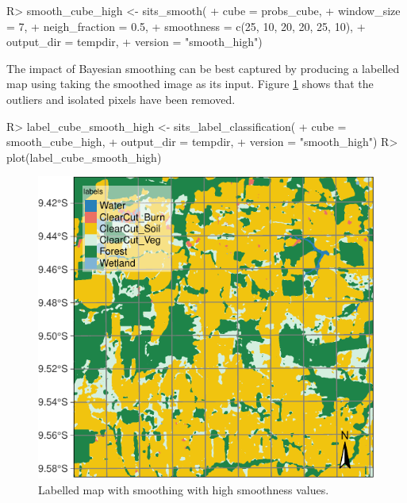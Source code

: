 \documentclass[
  shortnames]{jss}
\begin{document}
\begin{CodeChunk}
\begin{CodeInput}
R> smooth_cube_high <- sits_smooth(
+     cube = probs_cube,
+     window_size = 7,
+     neigh_fraction = 0.5,
+     smoothness = c(25, 10, 20, 20, 25, 10),
+     output_dir = tempdir,
+     version = "smooth_high")
\end{CodeInput}
\end{CodeChunk}

The impact of Bayesian smoothing can be best captured by producing a labelled map using  taking the smoothed image as its input. Figure \ref{fig:smth1} shows that the outliers and isolated pixels have been removed.

\begin{CodeChunk}
\begin{CodeInput}
R> label_cube_smooth_high <- sits_label_classification(
+     cube = smooth_cube_high,
+     output_dir = tempdir,
+     version = "smooth_high")
R> plot(label_cube_smooth_high)
\end{CodeInput}
\begin{figure}[h]

{\centering \includegraphics{Bayesian_smoothing_JSS_files/figure-latex/smth1-1} 

}

\caption[Labelled map with smoothing with high smoothness values]{Labelled map with smoothing with high smoothness values.}\label{fig:smth1}
\end{figure}
\end{CodeChunk}
\end{document}
